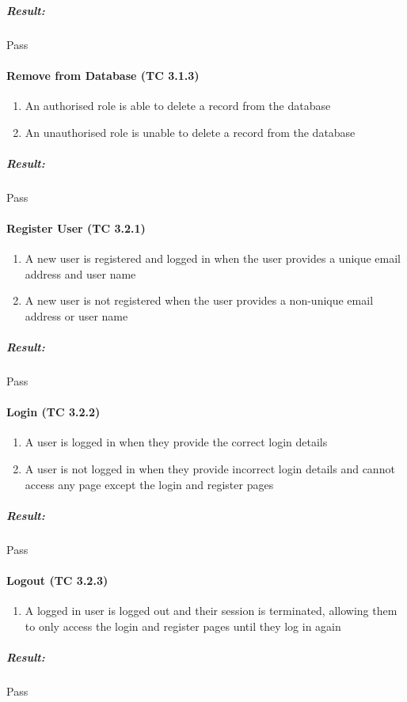 \documentclass{article}
\begin{document}
				\subparagraph{Result: } Pass
			
			\paragraph{Remove from Database (TC 3.1.3)}
				\begin{enumerate}
					\item An authorised role is able to delete a record from the database
					\item An unauthorised role is unable to delete a record from the database
				\end{enumerate}
				\subparagraph{Result: } Pass
			
			\paragraph{Register User (TC 3.2.1)}
				\begin{enumerate}
					\item A new user is registered and logged in when the user provides a unique email address and user name
					\item A new user is not registered when the user provides a non-unique email address or user name
				\end{enumerate}
				\subparagraph{Result: } Pass
			
			\paragraph{Login (TC 3.2.2)}
				\begin{enumerate}
					\item A user is logged in when they provide the correct login details
					\item A user is not logged in when they provide incorrect login details and cannot access any page except the login and register pages
				\end{enumerate}
				\subparagraph{Result: } Pass
			
			\paragraph{Logout (TC 3.2.3)}
				\begin{enumerate}
					\item A logged in user is logged out and their session is terminated, allowing them to only access the login and register pages until they log in again
				\end{enumerate}
				\subparagraph{Result: } Pass
			
\end{document}
